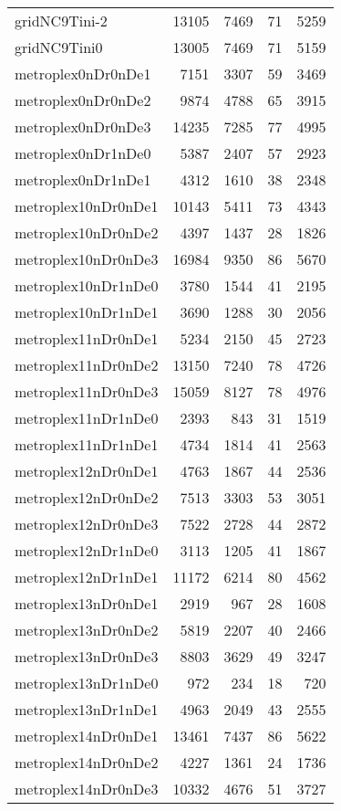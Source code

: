 \begin{longtable}{lrrrr}
gridNC9Tini-2 & 13105 & 7469 & 71 & 5259 \\
gridNC9Tini0 & 13005 & 7469 & 71 & 5159 \\
metroplex0nDr0nDe1 & 7151 & 3307 & 59 & 3469 \\
metroplex0nDr0nDe2 & 9874 & 4788 & 65 & 3915 \\
metroplex0nDr0nDe3 & 14235 & 7285 & 77 & 4995 \\
metroplex0nDr1nDe0 & 5387 & 2407 & 57 & 2923 \\
metroplex0nDr1nDe1 & 4312 & 1610 & 38 & 2348 \\
metroplex10nDr0nDe1 & 10143 & 5411 & 73 & 4343 \\
metroplex10nDr0nDe2 & 4397 & 1437 & 28 & 1826 \\
metroplex10nDr0nDe3 & 16984 & 9350 & 86 & 5670 \\
metroplex10nDr1nDe0 & 3780 & 1544 & 41 & 2195 \\
metroplex10nDr1nDe1 & 3690 & 1288 & 30 & 2056 \\
metroplex11nDr0nDe1 & 5234 & 2150 & 45 & 2723 \\
metroplex11nDr0nDe2 & 13150 & 7240 & 78 & 4726 \\
metroplex11nDr0nDe3 & 15059 & 8127 & 78 & 4976 \\
metroplex11nDr1nDe0 & 2393 & 843 & 31 & 1519 \\
metroplex11nDr1nDe1 & 4734 & 1814 & 41 & 2563 \\
metroplex12nDr0nDe1 & 4763 & 1867 & 44 & 2536 \\
metroplex12nDr0nDe2 & 7513 & 3303 & 53 & 3051 \\
metroplex12nDr0nDe3 & 7522 & 2728 & 44 & 2872 \\
metroplex12nDr1nDe0 & 3113 & 1205 & 41 & 1867 \\
metroplex12nDr1nDe1 & 11172 & 6214 & 80 & 4562 \\
metroplex13nDr0nDe1 & 2919 & 967 & 28 & 1608 \\
metroplex13nDr0nDe2 & 5819 & 2207 & 40 & 2466 \\
metroplex13nDr0nDe3 & 8803 & 3629 & 49 & 3247 \\
metroplex13nDr1nDe0 & 972 & 234 & 18 & 720 \\
metroplex13nDr1nDe1 & 4963 & 2049 & 43 & 2555 \\
metroplex14nDr0nDe1 & 13461 & 7437 & 86 & 5622 \\
metroplex14nDr0nDe2 & 4227 & 1361 & 24 & 1736 \\
metroplex14nDr0nDe3 & 10332 & 4676 & 51 & 3727 \\

\end{longtable}
